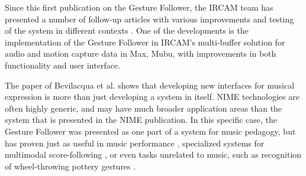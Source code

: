 Since this first publication on the Gesture Follower, the IRCAM team has presented a number of follow-up articles with various improvements and testing of the system in different contexts \cite{Bevilacqua:2010,Bevilacqua:2012}. One of the developments is the implementation of the Gesture Follower in IRCAM's multi-buffer solution for audio and motion capture data in Max, Mubu, with improvements in both functionality and user interface. 

The paper of Bevilacqua et al. shows that developing new interfaces for musical expression is more than just developing a system in itself. NIME technologies are often highly generic, and may have much broader application areas than the system that is presented in the NIME publication. In this specific case, the Gesture Follower was presented as one part of a system for music pedagogy, but has proven just as useful in music performance \cite{Van-Nort:2013}, specialized systems for multimodal score-following \cite{Ritter:2013}, or even tasks unrelated to music, such as recognition of wheel-throwing pottery gestures \cite{Manitsaris:2014}.

